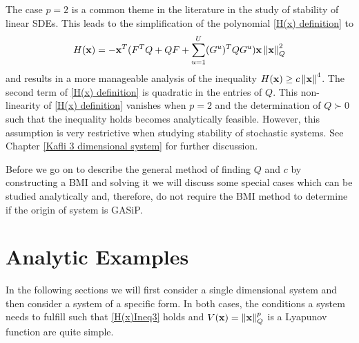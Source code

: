 \documentclass[a4paper,12pt,twoside,BCOR=10mm]{scrbook}
\begin{document}
The case $p = 2$ is a common theme in the literature in the study of stability of linear SDEs. This leads to the simplification of the polynomial \eqref{H(x) definition} to
\begin{align*}
    H(\mathbf{x}) = -\mathbf{x}^T (F^T Q + QF + \sum_{u = 1}^U (G^u)^TQG^u) \mathbf{x}\left\lVert\mathbf{x}\right\rVert_{Q}^{2}
\end{align*}
and results in a more manageable analysis of the inequality $H(\mathbf{x}) \geq c\left\lVert\mathbf{x}\right\rVert_{}^{4}$. The second term of \eqref{H(x) definition} is quadratic in the entries of $Q$. This non-linearity of \eqref{H(x) definition} vanishes when $p = 2$ and the determination of $Q \succ 0$ such that the inequality holds becomes analytically feasible. However, this assumption is very restrictive when studying stability of stochastic systems. See Chapter \ref{Kafli 3 dimensional system} for further discussion.

Before we go on to describe the general method of finding $Q$ and $c$ by constructing a BMI and solving it we will discuss some special cases which can be studied analytically and, therefore, do not require the BMI method to determine if the origin of system is GASiP.

\section{Analytic Examples}\label{SectionAnalyticExamples}
In the following sections we will first consider a single dimensional system and then consider a system of a specific form. In both cases, the conditions a system needs to fulfill such that \eqref{H(x)Ineq3} holds and $V(\mathbf{x}) = \left\lVert\mathbf{x}\right\rVert_Q^p$ is a Lyapunov function are quite simple.
\end{document}
